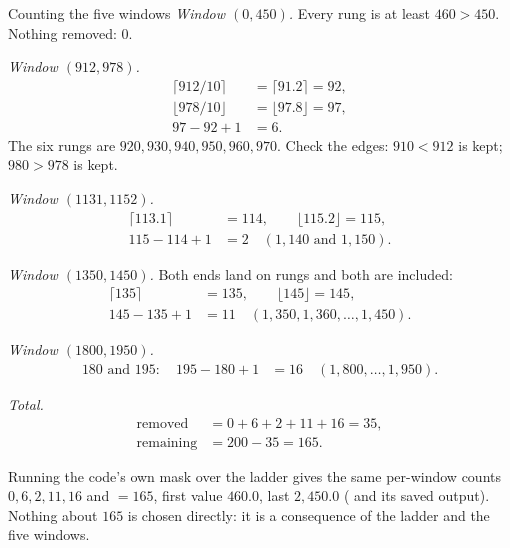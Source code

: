 \begin{worked}[label={we:sensors:windows}]{Counting the five windows}
\emph{Window $(0, 450)$.} Every rung is at least $460 > 450$. Nothing removed: $0$.

\emph{Window $(912, 978)$.}
\begin{align*}
\lceil 912/10 \rceil &= \lceil 91.2 \rceil = 92,\\
\lfloor 978/10 \rfloor &= \lfloor 97.8 \rfloor = 97,\\
97 - 92 + 1 &= 6.
\end{align*}
The six rungs are $920, 930, 940, 950, 960, 970$. Check the edges: $910 < 912$ is kept;
$980 > 978$ is kept.

\emph{Window $(1131, 1152)$.}
\begin{align*}
\lceil 113.1 \rceil &= 114, \qquad \lfloor 115.2 \rfloor = 115,\\
115 - 114 + 1 &= 2 \quad (1{,}140 \text{ and } 1{,}150).
\end{align*}

\emph{Window $(1350, 1450)$.} Both ends land on rungs and both are included:
\begin{align*}
\lceil 135 \rceil &= 135, \qquad \lfloor 145 \rfloor = 145,\\
145 - 135 + 1 &= 11 \quad (1{,}350, 1{,}360, \dots, 1{,}450).
\end{align*}

\emph{Window $(1800, 1950)$.}
\begin{align*}
180 \text{ and } 195: \quad 195 - 180 + 1 &= 16 \quad (1{,}800, \dots, 1{,}950).
\end{align*}

\emph{Total.}
\begin{align*}
\text{removed} &= 0 + 6 + 2 + 11 + 16 = 35,\\
\text{remaining} &= 200 - 35 = 165.
\end{align*}
\end{worked}

\begin{sourcenote}
Running the code's own mask over the ladder gives the same per-window counts $0, 6, 2, 11, 16$
and  $= 165$, first value $460.0$, last $2{,}450.0$
( and its saved output)\tagC. Nothing about
$165$ is chosen directly: it is a consequence of the ladder and the five windows.
\end{sourcenote}

